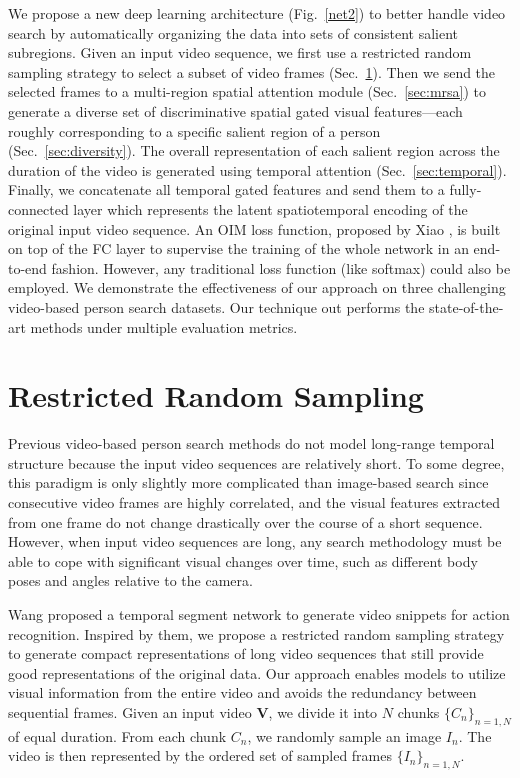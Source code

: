We propose a new deep learning architecture (Fig.~\ref{net2}) to better handle video search by automatically organizing the data into sets of consistent salient subregions. Given an input video sequence, we first use a restricted random sampling strategy to select a subset of video frames (Sec.~\ref{sample}). Then we send the selected frames to a multi-region spatial attention module (Sec.~\ref{sec:mrsa}) to generate a diverse set of discriminative spatial gated visual features---each roughly corresponding to a specific salient region of a person (Sec.~\ref{sec:diversity}).
The overall representation of each salient region across the duration of the video is generated using temporal attention (Sec.~\ref{sec:temporal}). Finally, we concatenate all temporal gated features and send them to a fully-connected layer which represents the latent spatiotemporal encoding of the original input video sequence. An OIM loss function, proposed by Xiao \etal \cite{xiao2017joint}, is built on top of the FC layer to supervise the training of the whole network in an end-to-end fashion. However, any traditional loss function (like softmax) could also be employed. We demonstrate the effectiveness of our approach on three challenging video-based person search datasets.  Our technique out performs the state-of-the-art methods under multiple evaluation metrics.


\section{Restricted Random Sampling} %
\label{sample}
Previous video-based person search methods \cite{mclaughlin2016recurrent,ma2017person,zhousee} do not model long-range temporal structure because the input video sequences are relatively short.  To some degree, this paradigm is only slightly more complicated than image-based search since consecutive video frames are highly correlated, and the visual features extracted from one frame do not change drastically over the course of a short sequence. However, when input video sequences are long, any search methodology must be able to cope with significant visual changes over time, such as different body poses and angles relative to the camera.  

Wang \etal \cite{wang2016temporal} proposed a temporal segment network to generate video snippets for action recognition. 
Inspired by them, we propose a restricted random sampling strategy to generate compact representations of long video sequences that still provide good representations of the original data. Our approach enables models to utilize visual information from the entire video and avoids the redundancy between sequential frames.
Given an input video $\mathbf{V}$, we divide it into $N$ chunks $\{C_n\}_{n=1,N}$ of equal duration. From each chunk $C_n$, we randomly sample an image $I_n$. The video is then represented by the ordered set of sampled frames $\{ I_n \}_{n=1,N}$. 



